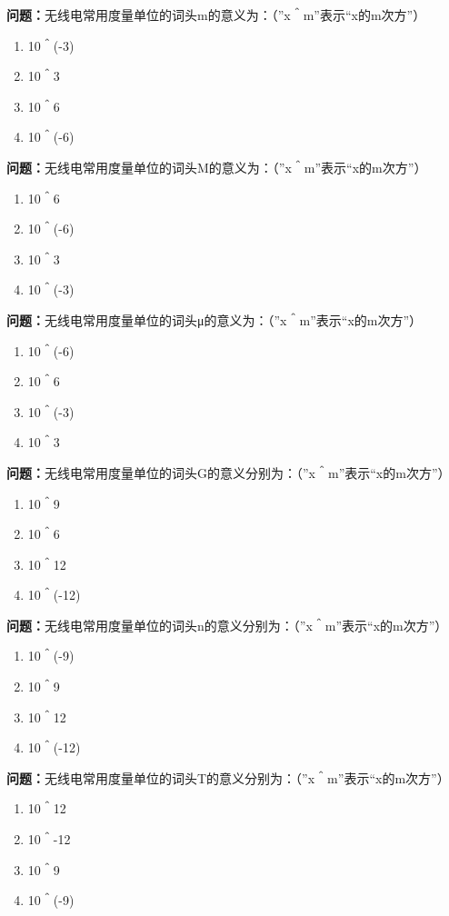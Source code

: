 \documentclass{ctexbook}
\begin{document}
\textbf{问题：}无线电常用度量单位的词头m的意义为：（”x＾m”表示“x的m次方”）
\begin{enumerate}[label=\Alph*), leftmargin=3em]
\item 10＾(-3)
\item 10＾3
\item 10＾6
\item 10＾(-6)
\end{enumerate}

\textbf{问题：}无线电常用度量单位的词头M的意义为：（”x＾m”表示“x的m次方”）
\begin{enumerate}[label=\Alph*), leftmargin=3em]
\item 10＾6
\item 10＾(-6)
\item 10＾3
\item 10＾(-3)
\end{enumerate}

\textbf{问题：}无线电常用度量单位的词头μ的意义为：（”x＾m”表示“x的m次方”）
\begin{enumerate}[label=\Alph*), leftmargin=3em]
\item 10＾(-6)
\item 10＾6
\item 10＾(-3)
\item 10＾3
\end{enumerate}

\textbf{问题：}无线电常用度量单位的词头G的意义分别为：（”x＾m”表示“x的m次方”）
\begin{enumerate}[label=\Alph*), leftmargin=3em]
\item 10＾9
\item 10＾6
\item 10＾12
\item 10＾(-12)
\end{enumerate}

\textbf{问题：}无线电常用度量单位的词头n的意义分别为：（”x＾m”表示“x的m次方”）
\begin{enumerate}[label=\Alph*), leftmargin=3em]
\item 10＾(-9)
\item 10＾9
\item 10＾12
\item 10＾(-12)
\end{enumerate}

\textbf{问题：}无线电常用度量单位的词头T的意义分别为：（”x＾m”表示“x的m次方”）
\begin{enumerate}[label=\Alph*), leftmargin=3em]
\item 10＾12
\item 10＾-12
\item 10＾9
\item 10＾(-9)
\end{enumerate}
\end{document}
